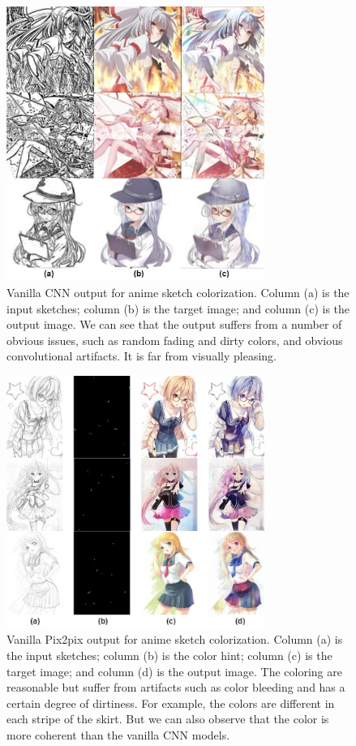 \begin{figure}
    \centering
    \includegraphics[width=0.75\textwidth]{images/colorization/cnn.jpg}
    \caption{Vanilla CNN output for anime sketch colorization. Column (a) is the input sketches; column (b) is the target image; and column (c) is the output image.\cite{fransOutlineColorizationTandem2017} We can see that the output suffers from a number of obvious issues, such as random fading and dirty colors, and obvious convolutional artifacts. It is far from visually pleasing.} 
    \label{fig:colorization_cnn}
\end{figure}

\begin{figure}
    \centering
    \includegraphics[width=0.75\textwidth]{images/colorization/pix2pix.jpg}
    \caption{Vanilla Pix2pix output for anime sketch colorization. Column (a) is the input sketches; column (b) is the color hint; column (c) is the target image; and column (d) is the output image.\cite{steinsDeepLearningProject2022} The coloring are reasonable but suffer from artifacts such as color bleeding and has a certain degree of dirtiness. For example, the colors are different in each stripe of the skirt. But we can also observe that the color is more coherent than the vanilla CNN models.} 
    \label{fig:colorization_pix2pix}
\end{figure}

